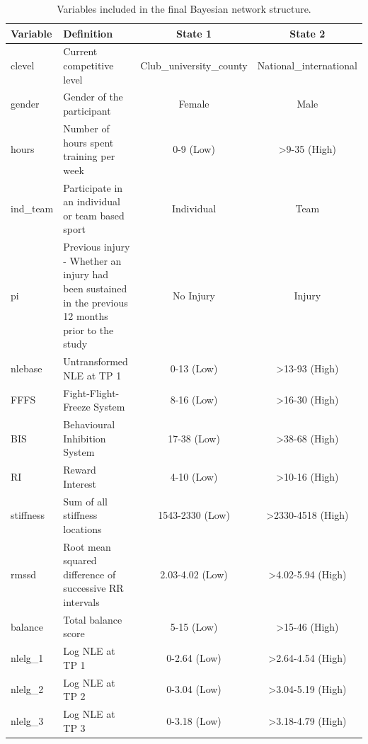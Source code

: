 \documentclass[man,floatsintext]{apa6}
\begin{document}
\begin{table}[H]

\caption{\label{tab:finalvars}Variables included in the final Bayesian network structure.}
\centering
\begin{tabular}[t]{l>{\raggedright\arraybackslash}p{5.2cm}cc}
\toprule
Variable & Definition & State 1 & State 2\\
\midrule
clevel & Current competitive level & Club\_university\_county & National\_international\\
gender & Gender of the participant & Female & Male\\
hours & Number of hours spent training per week & 0-9 (Low) & >9-35 (High)\\
ind\_team & Participate in an individual or team based sport & Individual & Team\\
pi & Previous injury - Whether an injury had been sustained in the previous 12 months prior to the study & No Injury & Injury\\
\addlinespace
nlebase & Untransformed NLE at TP 1 & 0-13 (Low) & >13-93 (High)\\
FFFS & Fight-Flight-Freeze System & 8-16 (Low) & >16-30 (High)\\
BIS & Behavioural Inhibition System & 17-38 (Low) & >38-68 (High)\\
RI & Reward Interest & 4-10 (Low) & >10-16 (High)\\
stiffness & Sum of all stiffness locations & 1543-2330 (Low) & >2330-4518 (High)\\
\addlinespace
rmssd & Root mean squared difference of successive RR intervals & 2.03-4.02 (Low) & >4.02-5.94 (High)\\
balance & Total balance score & 5-15 (Low) & >15-46 (High)\\
nlelg\_1 & Log NLE at TP 1 & 0-2.64 (Low) & >2.64-4.54 (High)\\
nlelg\_2 & Log NLE at TP 2 & 0-3.04 (Low) & >3.04-5.19 (High)\\
nlelg\_3 & Log NLE at TP 3 & 0-3.18 (Low) & >3.18-4.79 (High)\\
\bottomrule
\end{tabular}
\end{table}
\end{document}
